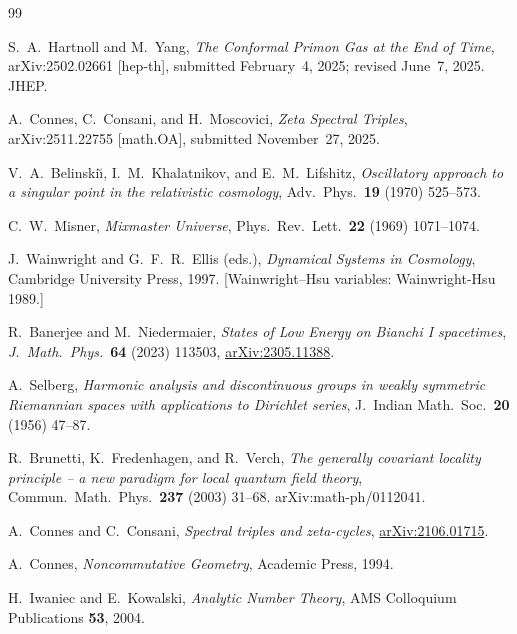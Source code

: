\documentclass[11pt]{article}
\begin{document}
\begin{thebibliography}{99}

S.~A.~Hartnoll and M.~Yang,
\emph{The Conformal Primon Gas at the End of Time},
arXiv:2502.02661 [hep-th], submitted February~4, 2025; revised June~7, 2025.
JHEP.

A.~Connes, C.~Consani, and H.~Moscovici,
\emph{Zeta Spectral Triples},
arXiv:2511.22755 [math.OA], submitted November~27, 2025.

V.~A.~Belinski\u{\i}, I.~M.~Khalatnikov, and E.~M.~Lifshitz,
\emph{Oscillatory approach to a singular point in the relativistic
  cosmology},
Adv.\ Phys.\ \textbf{19} (1970) 525--573.

C.~W.~Misner,
\emph{Mixmaster Universe},
Phys.\ Rev.\ Lett.\ \textbf{22} (1969) 1071--1074.

J.~Wainwright and G.~F.~R.~Ellis (eds.),
\emph{Dynamical Systems in Cosmology},
Cambridge University Press, 1997.
[Wainwright--Hsu variables: Wainwright-Hsu 1989.]

R.~Banerjee and M.~Niedermaier,
\emph{States of Low Energy on Bianchi I spacetimes},
\emph{J.\ Math.\ Phys.}\ \textbf{64} (2023) 113503,
\href{http://arxiv.org/abs/2305.11388}{arXiv:2305.11388}.

A.~Selberg,
\emph{Harmonic analysis and discontinuous groups in weakly symmetric
  Riemannian spaces with applications to Dirichlet series},
J.\ Indian Math.\ Soc.\ \textbf{20} (1956) 47--87.

R.~Brunetti, K.~Fredenhagen, and R.~Verch,
\emph{The generally covariant locality principle -- a new paradigm for
  local quantum field theory},
Commun.\ Math.\ Phys.\ \textbf{237} (2003) 31--68.
arXiv:math-ph/0112041.

A.~Connes and C.~Consani,
\emph{Spectral triples and zeta-cycles},
\href{http://arxiv.org/abs/2106.01715}{arXiv:2106.01715}.

A.~Connes,
\emph{Noncommutative Geometry},
Academic Press, 1994.

H.~Iwaniec and E.~Kowalski,
\emph{Analytic Number Theory},
AMS Colloquium Publications \textbf{53}, 2004.


\end{thebibliography}
\end{document}
